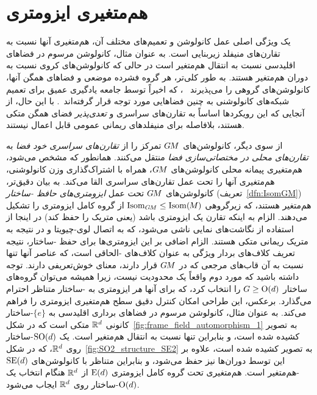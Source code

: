 

\section{هم‌متغیری ایزومتری}
\label{sec:isometry_intro}


یک ویژگی اصلی عمل کانولوشن و تعمیم‌های مختلف آن، هم‌متغیری آنها نسبت به تقارن‌های منیفلد زیربنایی است.
به عنوان مثال، کانولوشن مرسوم در فضاهای اقلیدسی نسبت به انتقال هم‌متغیر است در حالی که کانولوشن‌های کروی نسبت به دوران هم‌متغیر هستند.
به طور کلی‌تر، هر گروه فشرده موضعی و فضاهای همگن آنها، کانولوشن‌های گروهی را می‌پذیرند
~\cite{gurarie1992symmetries,kowalski2010introduction,chirikjian2001engineering,gallier2019harmonicRepr}،
که اخیراً توسط جامعه یادگیری عمیق برای تعمیم شبکه‌های کانولوشنی به چنین فضاهایی مورد توجه قرار گرفته‌اند~\cite{Cohen2016-GCNN,Kondor2018-GENERAL,Cohen2019-generaltheory,bekkers2020bspline}.
با این حال، از آنجایی که این رویکردها اساساً به تقارن‌های سراسری و \emph{تعدی‌پذیر} فضای همگن متکی هستند، بلافاصله برای منیفلدهای ریمانی عمومی قابل اعمال نیستند.

از سوی دیگر، کانولوشن‌های $G\mkern-1.4muM$ تمرکز را از \emph{تقارن‌های سراسری خود فضا} به \emph{تقارن‌های محلی در مختصاتی‌سازی فضا} منتقل می‌کنند.
همانطور که مشخص می‌شود، هم‌متغیری پیمانه محلی کانولوشن‌های $G\mkern-1.4muM$، همراه با اشتراک‌گذاری وزن کانولوشنی، هم‌متغیری آنها را تحت عمل تقارن‌های سراسری القا می‌کند.
به بیان دقیق‌تر، کانولوشن‌های $G\mkern-1.4muM$ تحت عمل \emph{ایزومتری‌های حافظ -ساختار} (تعریف~\ref{dfn:IsomGM}) هم‌متغیر هستند، که زیرگروهی $\operatorname{Isom}_{G\mkern-1.4muM} \leq \operatorname{Isom}(\mkern-1.5mu M \mkern-.5mu)$ از گروه کامل ایزومتری را تشکیل می‌دهند.
الزام به اینکه تقارن یک ایزومتری باشد (یعنی متریک را حفظ کند) در اینجا از استفاده از نگاشت‌های نمایی ناشی می‌شود، که به اتصال لوی-چیویتا و در نتیجه به متریک ریمانی متکی هستند.
الزام اضافی بر این ایزومتری‌ها برای حفظ -ساختار، نتیجه تعریف کلاف‌های بردار ویژگی به عنوان کلاف‌های -الحاقی است، که عناصر آنها تنها نسبت به آن قاب‌های مرجعی که در $G\mkern-1.4muM$ قرار دارند، معنای خوش‌تعریفی دارند.
توجه داشته باشید که مورد دوم واقعاً یک محدودیت نیست، زیرا همیشه می‌توان گروه‌های ساختار $G\geq\operatorname{O}(d)$ را انتخاب کرد، که برای آنها \emph{هر} ایزومتری به -ساختار متناظر احترام می‌گذارد.
برعکس، این طراحی امکان کنترل دقیق سطح هم‌متغیری ایزومتری را فراهم می‌کند.
به عنوان مثال، کانولوشن مرسوم در فضاهای برداری اقلیدسی به $\{e\}$-ساختار کانونی $\mathbb{R}^d$ متکی است که در شکل~\ref{fig:frame_field_automorphism_1} به تصویر کشیده شده است، و بنابراین تنها نسبت به انتقال هم‌متغیر است.
یک $\operatorname{SO}(d)$-ساختار روی $\mathbb{R}^d$، که در شکل~\ref{fig:SO2_structure_SE2} به تصویر کشیده شده است، علاوه بر این توسط دوران‌ها نیز حفظ می‌شود، و بنابراین متناظر با کانولوشن‌های $\operatorname{SE}(d)$-هم‌متغیر است.
هم‌متغیری تحت گروه کامل ایزومتری $\operatorname{E}(d)$ از $\mathbb{R}^d$ هنگام انتخاب یک $\operatorname{O}(d)$-ساختار روی $\mathbb{R}^d$ ایجاب می‌شود.


